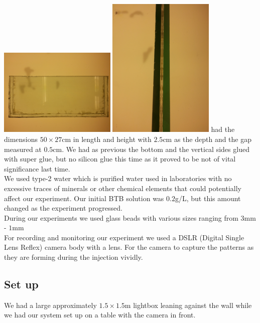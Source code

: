 \documentclass[twoside]{article}
\begin{document}
\begin{multicols}{2}
\includegraphics[width=0.42\textwidth]{plate2.jpg}\label{fig:plate2}
\vspace{0.2cm}
\includegraphics[width=0.38\textwidth]{plate2g.jpg}\label{fig:plate2g}
\vspace{0.3cm}
had the dimensions $50 \times 27$cm in length and height with $2.5$cm as the depth and the gap measured at $0.5$cm. We had as previous the bottom and the vertical sides glued with super glue, but no silicon glue this time as it proved to be not of vital significance last time.\\
We used type-2 water which is purified water used in laboratories with no excessive traces of minerals or other chemical elements that could potentially affect our experiment. Our initial BTB solution was $0.2$g/L, but this amount changed as the experiment progressed.\\
During our experiments we used glass beads with various sizes ranging from $3$mm - $1$mm\\
For recording and monitoring our experiment we used a DSLR (Digital Single Lens Reflex) camera body with a lens. For the camera to capture the patterns as they are forming during the injection vividly. 

\subsection{Set up}
We had a large approximately $1.5 \times 1.5$m lightbox leaning against the wall while we had our system set up on a table with the camera in front. \\


\end{multicols}
\end{document}
